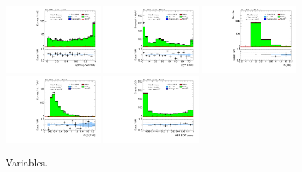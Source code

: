 \begin{figure}[tp]
  \includegraphics[width=0.32\textwidth]{figures/analysis/vbf-SSXCR/lep-eta-centrality}
  \includegraphics[width=0.32\textwidth]{figures/analysis/vbf-SSXCR/system-pt}
  \includegraphics[width=0.32\textwidth]{figures/analysis/vbf-SSXCR/n-jets30}
  \includegraphics[width=0.32\textwidth]{figures/analysis/vbf-SSXCR/dijet-m-veryhigh}
  \includegraphics[width=0.32\textwidth]{figures/analysis/vbf-SSXCR/BDTEve-VBF}
  \caption{Variables.}
  \label{fig:backgrounds-SSXCR-jets}
\end{figure}

